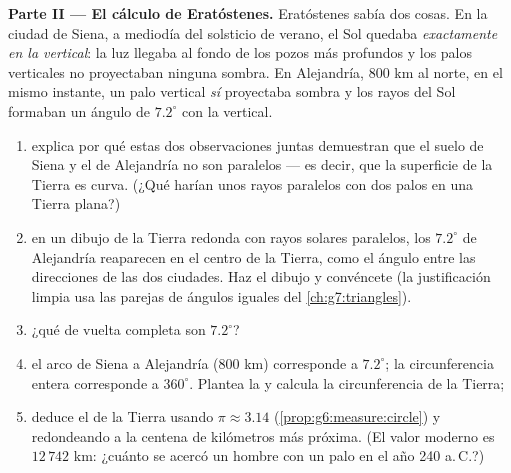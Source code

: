\begin{problem}
\medskip
\noindent\textbf{Parte II --- El cálculo de Eratóstenes.}
Eratóstenes sabía dos cosas. En la ciudad de Siena, a mediodía del
solsticio de verano, el Sol quedaba \emph{exactamente en la vertical}: la luz
llegaba al fondo de los pozos más profundos y los palos verticales no proyectaban
ninguna sombra. En Alejandría, $800$ km al norte, en el mismo instante,
un palo vertical \emph{sí} proyectaba sombra y los rayos del Sol
formaban un ángulo de $7.2^\circ$ con la vertical.
\begin{enumerate}[resume]
  \item explica por qué estas dos observaciones juntas demuestran que
        el suelo de Siena y el de Alejandría no son
        paralelos --- es decir, que la superficie de la Tierra es curva.
        (¿Qué harían unos rayos paralelos con dos palos en una Tierra
        plana?)
  \item en un dibujo de la Tierra redonda con rayos solares paralelos,
        los $7.2^\circ$ de Alejandría reaparecen en el centro de
        la Tierra, como el ángulo entre las direcciones de las
        dos ciudades. Haz el dibujo y convéncete (la
        justificación limpia usa las parejas de ángulos iguales del
        \cref{ch:g7:triangles}).
  \item ¿qué  de vuelta completa son $7.2^\circ$?
  \item el arco de Siena a Alejandría ($800$ km) corresponde
        a $7.2^\circ$; la circunferencia entera corresponde a
        $360^\circ$. Plantea la  y calcula la
        circunferencia de la Tierra;
  \item deduce el  de la Tierra usando $\pi \approx
        3.14$ (\cref{prop:g6:measure:circle}) y redondeando a la
        centena de kilómetros más próxima. (El valor moderno es
        $12\,742$ km: ¿cuánto se acercó un hombre con un palo en el
        año 240 a.\,C.?)
\end{enumerate}


\end{problem}
